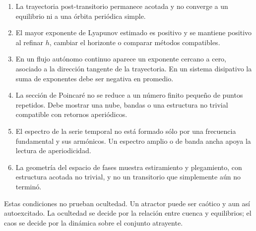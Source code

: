 \documentclass[11pt]{article}
\begin{document}
\begin{enumerate}
  \item La trayectoria post-transitorio permanece acotada y no converge a un
  equilibrio ni a una órbita periódica simple.
  \item El mayor exponente de Lyapunov estimado es positivo y se mantiene
  positivo al refinar \(h\), cambiar el horizonte o comparar métodos
  compatibles.
  \item En un flujo autónomo continuo aparece un exponente cercano a cero,
  asociado a la dirección tangente de la trayectoria. En un sistema
  disipativo la suma de exponentes debe ser negativa en promedio.
  \item La sección de Poincaré no se reduce a un número finito pequeño de
  puntos repetidos. Debe mostrar una nube, bandas o una estructura no trivial
  compatible con retornos aperiódicos.
  \item El espectro de la serie temporal no está formado sólo por una
  frecuencia fundamental y sus armónicos. Un espectro amplio o de banda ancha
  apoya la lectura de aperiodicidad.
  \item La geometría del espacio de fases muestra estiramiento y plegamiento,
  con estructura acotada no trivial, y no un transitorio que simplemente aún
  no terminó.
\end{enumerate}

Estas condiciones no prueban ocultedad. Un atractor puede ser caótico y aun
así autoexcitado. La ocultedad se decide por la relación entre cuenca y
equilibrios; el caos se decide por la dinámica sobre el conjunto atrayente.
\end{document}
